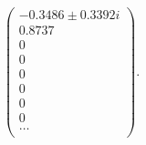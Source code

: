 \begin{equation}
\left(
\begin{array}{c}
-0.3486\pm 0.3392 i\\
0.8737\\
0\\
0\\
0\\
0\\
0\\
0\\
\ldots\\
\end{array}
\right).
\end{equation}

